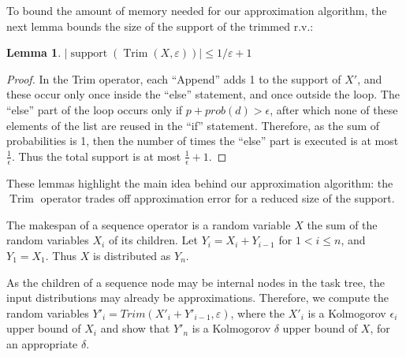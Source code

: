 \documentclass{article}
\newtheorem{lemma}{Lemma}
\DeclareMathOperator{\Trim}{Trim}
\begin{document}
To bound the amount of memory needed for our approximation algorithm,
the next lemma bounds the size of the support of the trimmed r.v.:

\begin{lemma} \label{SizeD}
$|\operatorname{support}(\Trim(X,\varepsilon))| \leq 1/\varepsilon +1$
\end{lemma}

\begin{proof}
In the Trim operator, each ``Append'' adds 1 to the support of $X'$, and these occur only once inside
the ``else'' statement, and once outside the loop.
The ``else'' part of the loop occurs only if $p+prob(d)> \epsilon$,
after which none of these elements of the list are reused in the ``if'' statement.
Therefore, as the sum of probabilities is 1, then the number of times
the ``else'' part is executed is at most $\frac{1}{\epsilon}$. Thus the total support
is at most $\frac{1}{\epsilon}+1$.
\end{proof}



These lemmas highlight the main idea behind our approximation 
algorithm: the $\Trim$ operator trades off approximation error 
for a reduced size of the support. 

The makespan of a sequence operator is a random variable $X$ the sum 
of the random variables $X_i$ of its children.
Let $Y_i = X_i + Y_{i-1}$ for $1< i \leq n$, and $Y_1=X_1$.
Thus $X$ is distributed as $Y_n$.

As the children of a sequence node may be internal nodes in the task tree,
the input distributions may already be approximations.
Therefore, we compute the random variables $Y'_i = Trim(X'_i + Y'_{i-1}, \varepsilon)$,
where the $X'_i$ is a Kolmogorov $\epsilon_i $ upper bound of $X_i$
and show that $Y'_n$ is a Kolmogorov $\delta $ upper bound of $X$, for an appropriate $\delta $.
\end{document}
